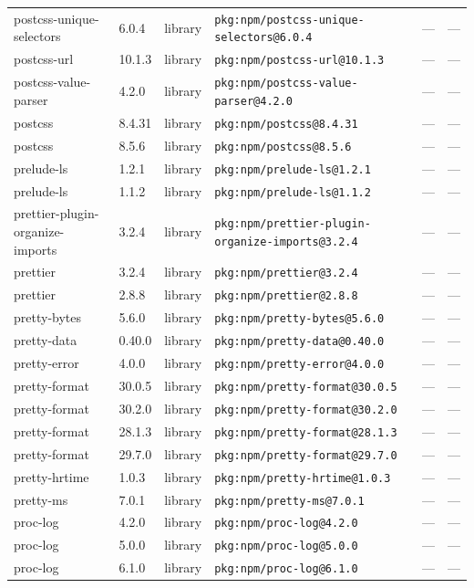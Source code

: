 \documentclass[11pt]{article}
\begin{document}
\begin{longtable}{|l|l|l|p{2.2cm}|l|p{4cm}|}
postcss-unique-selectors & 6.0.4 & library & \texttt{pkg:npm/postcss-unique-selectors@6.0.4} & — & — \\
postcss-url & 10.1.3 & library & \texttt{pkg:npm/postcss-url@10.1.3} & — & — \\
postcss-value-parser & 4.2.0 & library & \texttt{pkg:npm/postcss-value-parser@4.2.0} & — & — \\
postcss & 8.4.31 & library & \texttt{pkg:npm/postcss@8.4.31} & — & — \\
postcss & 8.5.6 & library & \texttt{pkg:npm/postcss@8.5.6} & — & — \\
prelude-ls & 1.2.1 & library & \texttt{pkg:npm/prelude-ls@1.2.1} & — & — \\
prelude-ls & 1.1.2 & library & \texttt{pkg:npm/prelude-ls@1.1.2} & — & — \\
prettier-plugin-organize-imports & 3.2.4 & library & \texttt{pkg:npm/prettier-plugin-organize-imports@3.2.4} & — & — \\
prettier & 3.2.4 & library & \texttt{pkg:npm/prettier@3.2.4} & — & — \\
prettier & 2.8.8 & library & \texttt{pkg:npm/prettier@2.8.8} & — & — \\
pretty-bytes & 5.6.0 & library & \texttt{pkg:npm/pretty-bytes@5.6.0} & — & — \\
pretty-data & 0.40.0 & library & \texttt{pkg:npm/pretty-data@0.40.0} & — & — \\
pretty-error & 4.0.0 & library & \texttt{pkg:npm/pretty-error@4.0.0} & — & — \\
pretty-format & 30.0.5 & library & \texttt{pkg:npm/pretty-format@30.0.5} & — & — \\
pretty-format & 30.2.0 & library & \texttt{pkg:npm/pretty-format@30.2.0} & — & — \\
pretty-format & 28.1.3 & library & \texttt{pkg:npm/pretty-format@28.1.3} & — & — \\
pretty-format & 29.7.0 & library & \texttt{pkg:npm/pretty-format@29.7.0} & — & — \\
pretty-hrtime & 1.0.3 & library & \texttt{pkg:npm/pretty-hrtime@1.0.3} & — & — \\
pretty-ms & 7.0.1 & library & \texttt{pkg:npm/pretty-ms@7.0.1} & — & — \\
proc-log & 4.2.0 & library & \texttt{pkg:npm/proc-log@4.2.0} & — & — \\
proc-log & 5.0.0 & library & \texttt{pkg:npm/proc-log@5.0.0} & — & — \\
proc-log & 6.1.0 & library & \texttt{pkg:npm/proc-log@6.1.0} & — & — \\

\end{longtable}
\end{document}
